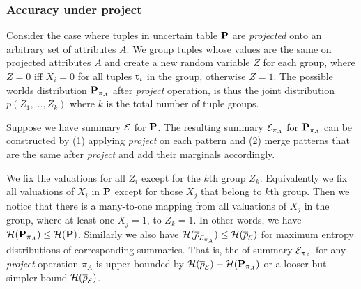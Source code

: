 \subsubsection{Accuracy under project}
Consider the case where tuples in uncertain table $\mathbf{P}$ are \emph{projected} onto an arbitrary set of attributes $A$.
We group tuples whose values are the same on projected attributes $A$ and create a new random variable $Z$ for each group, where $Z=0$ iff $X_i=0$ for all tuples $\mathbf{t}_i$ in the group, otherwise $Z=1$.
The possible worlds distribution $\mathbf{P}_{\pi_A}$ after \emph{project} operation, is thus the joint distribution $p(Z_1,\ldots,Z_k)$ where $k$ is the total number of tuple groups.

Suppose we have summary $\mathcal E$ for $\mathbf{P}$. 
The resulting summary $\mathcal E_{\pi_A}$ for $\mathbf{P}_{\pi_A}$ can be constructed by (1) applying \emph{project} on each pattern and (2) merge patterns that are the same after \emph{project} and add their marginals accordingly.

We fix the valuations for all $Z_i$ except for the $k$th group $Z_k$.
Equivalently we fix all valuations of $X_i$ in $\mathbf{P}$ except for those $X_j$ that belong to $k$th group.
Then we notice that there is a many-to-one mapping from all valuations of $X_j$ in the group, where at least one $X_j=1$, to $Z_k=1$.
In other words, we have $\mathcal{H}(\mathbf{P}_{\pi_A})\leq \mathcal{H}(\mathbf{P})$.
Similarly we also have $\mathcal{H}(\overline{\rho}_{\mathcal E_{\pi_A}})\leq \mathcal{H}(\overline{\rho}_{\mathcal E})$ for maximum entropy distributions of corresponding summaries.
That is, the \Errorname of summary $\mathcal E_{\pi_A}$ for any \emph{project} operation $\pi_A$ is upper-bounded by $\mathcal{H}(\overline{\rho}_{\mathcal E})-\mathcal{H}(\mathbf{P}_{\pi_A})$ or a looser but simpler bound $\mathcal{H}(\overline{\rho}_{\mathcal E})$.

